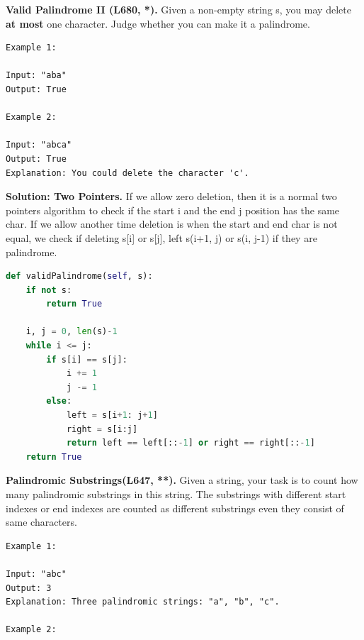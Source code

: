 \documentclass[../main.tex]{subfiles}
\begin{document}
\begin{examples}[resume]
\item \textbf{Valid Palindrome II (L680, *).} Given a non-empty string s, you may delete \textbf{at most} one character. Judge whether you can make it a palindrome. 
\begin{lstlisting}[numbers=none]
Example 1:

Input: "aba"
Output: True

Example 2:

Input: "abca"
Output: True
Explanation: You could delete the character 'c'.
\end{lstlisting}
\textbf{Solution: Two Pointers.} If we allow zero deletion, then it is a normal two pointers algorithm to check if the start i and the end j position has the same char. If we allow another time deletion is when the start and end char is not equal, we check if deleting s[i] or s[j], left s(i+1, j) or s(i, j-1) if they are palindrome. 
\begin{lstlisting}[language=Python]
def validPalindrome(self, s):
    if not s:
        return True
    
    i, j = 0, len(s)-1
    while i <= j:
        if s[i] == s[j]:
            i += 1
            j -= 1
        else:
            left = s[i+1: j+1]
            right = s[i:j]
            return left == left[::-1] or right == right[::-1]
    return True
\end{lstlisting}
\item \label{l647} \textbf{Palindromic Substrings(L647, **).}  Given a string, your task is to count how many palindromic substrings in this string. The substrings with different start indexes or end indexes are counted as different substrings even they consist of same characters. 
\begin{lstlisting}[numbers=none]
Example 1:

Input: "abc"
Output: 3
Explanation: Three palindromic strings: "a", "b", "c".

Example 2:


\end{lstlisting}
\end{examples}
\end{document}
